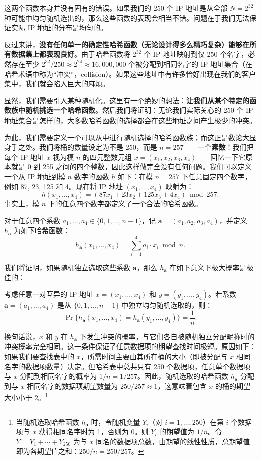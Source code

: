 这两个函数本身并没有固有的错误。如果我们的 250 个 IP 地址是从全部 $N = 2^{32}$ 种可能中均匀随机选出的，那么这些函数的表现会相当不错。问题在于我们无法保证实际 IP 地址的分布是均匀的。

反过来讲，\textbf{没有任何单一的确定性哈希函数（无论设计得多么精巧复杂）能够在所有数据集上都表现良好}。由于哈希函数将 $2^{32}$ 个 IP 地址映射到仅 250 个名字，必然存在至少 $2^{32} / 250 \approx 2^{24} \approx 16,000,000$ 个被分配到相同名字的 IP 地址集合（在哈希术语中称为“冲突”，collision）。如果这些地址中有许多恰好出现在我们的客户集中，我们就会陷入巨大的麻烦。

显然，我们需要引入某种随机化。这里有一个绝妙的想法：\textbf{让我们从某个特定的函数族中随机挑选一个哈希函数}。然后我们将证明：无论我们实际关心的 250 个 IP 地址集合是怎样的，大多数哈希函数的选择都会在这些地址之间产生极少的冲突。

为此，我们需要定义一个可以从中进行随机选择的哈希函数族；而这正是数论大显身手之处。我们将桶的数量设定为不是 250，而是 $n = 257$——一个\textbf{素数}！我们把每个 IP 地址 $x$ 视为模 $n$ 的四元整数元组 $x = (x_1, x_2, x_3, x_4)$——回忆一下它原本就是 0 到 255 之间的四个整数，因此这样做完全没有任何问题。我们可以定义一个从 IP 地址到模 $n$ 数字的函数 $h$ 如下：在模 $n = 257$ 下任意固定四个数字，例如 87, 23, 125 和 4。现在将 IP 地址 $(x_1, \dots, x_4)$ 映射为：
\[
h(x_1, \dots, x_4) = (87x_1 + 23x_2 + 125x_3 + 4x_4) \bmod 257.
\]
事实上，模 $n$ 下的任意四个数字都定义了一个合法的哈希函数。

对于任意四个系数 $a_1, \dots, a_4 \in \{0, 1, \dots, n-1\}$，记 $\bm{a} = (a_1, a_2, a_3, a_4)$，并定义 $h_{\bm{a}}$ 为如下哈希函数：
\[
h_{\bm{a}}(x_1, \dots, x_4) = \sum_{i=1}^4 a_i \cdot x_i \bmod n.
\]

我们将证明，如果随机独立选取这些系数 $\bm{a}$，那么 $h_{\bm{a}}$ 在如下意义下极大概率是极佳的：

\begin{property}
考虑任意一对互异的 IP 地址 $x = (x_1, \dots, x_4)$ 和 $y = (y_1, \dots, y_4)$。若系数 $\bm{a} = (a_1, \dots, a_4)$ 是从 $\{0, 1, \dots, n-1\}$ 中独立均匀随机选取的，则：
\[
\Pr\{h_{\bm{a}}(x_1, \dots, x_4) = h_{\bm{a}}(y_1, \dots, y_4)\} = \frac{1}{n}.
\]
\end{property}

换句话说，$x$ 和 $y$ 在 $h_{\bm{a}}$ 下发生冲突的概率，与它们各自被随机独立分配昵称时的冲突概率完全相同。这一条件保证了任意数据项的期望查找时间极短。原因如下：如果我们要查找表中的 $x$，所需时间主要由其所在桶的大小（即被分配与 $x$ 相同名字的数据项数量）决定。但哈希表中总共只有 250 个数据项，任意单个数据项与 $x$ 分配到相同名字的概率为 $1/n = 1/257$。因此，随机选取的哈希函数 $h_{\bm{a}}$ 分配到与 $x$ 相同名字的数据项期望数量为 $250/257 \approx 1$，这意味着包含 $x$ 的桶的期望大小小于 2。\footnote{当随机选取哈希函数 $h_{\bm{a}}$ 时，令随机变量 $Y_i$（对 $i = 1, \dots, 250$）在第 $i$ 个数据项与 $x$ 获得相同名字时为 1，否则为 0。则 $Y_i$ 的期望值为 $1/n$。令 $Y = Y_1 + \cdots + Y_{250}$ 为与 $x$ 同名的数据项总数，由期望的线性性质，总期望值即为各期望值之和：$250/n = 250/257$。}

